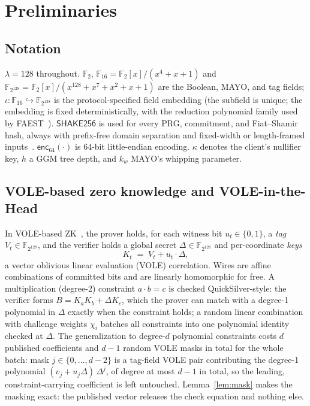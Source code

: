 \documentclass[11pt]{article}
\newcommand{\F}{\mathbb{F}}
\newcommand{\Ftwo}{\F_2}
\newcommand{\Fsixteen}{\F_{16}}
\newcommand{\Ftag}{\F_{2^{128}}}
\newcommand{\shake}{\mathsf{SHAKE256}}
\newcommand{\enc}{\mathsf{enc}_{64}}
\begin{document}
\section{Preliminaries}

\subsection{Notation}
$\lambda = 128$ throughout. $\Ftwo$, $\Fsixteen = \Ftwo[x]/(x^4{+}x{+}1)$ and
$\Ftag = \Ftwo[x]/(x^{128}{+}x^7{+}x^2{+}x{+}1)$ are the Boolean, MAYO, and
tag fields; $\iota : \Fsixteen \hookrightarrow \Ftag$ is the
protocol-specified field embedding (the subfield is unique; the embedding is
fixed deterministically, with the reduction polynomial family used by
FAEST~\cite{FAEST}). $\shake$ is used for every PRG, commitment, and
Fiat--Shamir hash, always with prefix-free domain separation and
fixed-width or length-framed inputs~\cite{FIPS202}. $\enc(\cdot)$ is 64-bit
little-endian encoding. $\kappa$ denotes the client's nullifier key, $h$ a
GGM tree depth, and $k_w$ MAYO's whipping parameter.

\subsection{VOLE-based zero knowledge and VOLE-in-the-Head}
\label{sec:voleith}

In VOLE-based ZK~\cite{Wolverine,QuickSilver}, the prover holds, for each
witness bit $u_t \in \{0,1\}$, a \emph{tag} $V_t \in \Ftag$, and the verifier
holds a global secret $\Delta \in \Ftag$ and per-coordinate \emph{keys}
\[
K_t \;=\; V_t + u_t \cdot \Delta ,
\]
a vector oblivious linear evaluation (VOLE) correlation. Wires are affine
combinations of committed bits and are linearly homomorphic for free. A
multiplication (degree-2) constraint $a \cdot b = c$ is checked
QuickSilver-style: the verifier forms $B = K_a K_b + \Delta K_c$, which the
prover can match with a degree-1 polynomial in $\Delta$ exactly when the
constraint holds; a random linear combination with challenge weights
$\chi_i$ batches all constraints into one polynomial identity checked at
$\Delta$. The generalization to degree-$d$ polynomial constraints costs
$d$ published coefficients and $d-1$ random VOLE masks in total for the whole
batch: mask $j \in \{0,\dots,d-2\}$ is a tag-field VOLE pair contributing
the degree-1 polynomial $(v_j + u_j\Delta)\,\Delta^{j}$, of degree at most
$d-1$ in total, so the leading, constraint-carrying coefficient is left
untouched. Lemma~\ref{lem:mask} makes the masking exact: the published
vector releases the check equation and nothing else.
\end{document}

